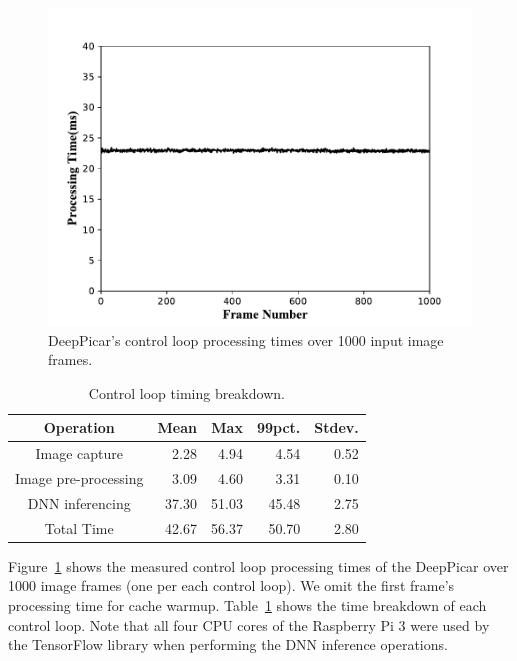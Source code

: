 
\begin{figure}[t]
  \centering
  \includegraphics[width=.75\textwidth]{figs/Fig7_new}
  \caption{DeepPicar's control loop processing times over 1000 input image frames.}
  \label{fig:control-loop-timing}
\end{figure}

\begin{table}[t]
  \centering
  \begin{tabular} {| c | r | r | r | r |}
    \hline
    \textbf{Operation} & \textbf{Mean} & \textbf{Max} &   \textbf{99pct.} & \textbf{Stdev.} \\ \hline
    Image capture        & 2.28  &  4.94 &  4.54  & 0.52 \\ \hline
    Image pre-processing & 3.09  &  4.60 &  3.31  & 0.10 \\ \hline
    DNN inferencing      & 37.30 & 51.03 & 45.48  & 2.75 \\ \hline
    Total Time           & 42.67 & 56.37 & 50.70  & 2.80 \\ \hline
  \end{tabular}
  \caption{Control loop timing breakdown.}
  \label{tbl:control-loop-breakdown}
\end{table}

Figure~\ref{fig:control-loop-timing} shows the measured control loop 
processing times of the DeepPicar over 1000 image frames (one per each
control loop). We omit the first frame's processing time for cache
warmup. Table~\ref{tbl:control-loop-breakdown} shows the time
breakdown of each control loop. Note that all four CPU cores of the
Raspberry Pi 3 were used by the TensorFlow library when performing the
DNN inference operations.

